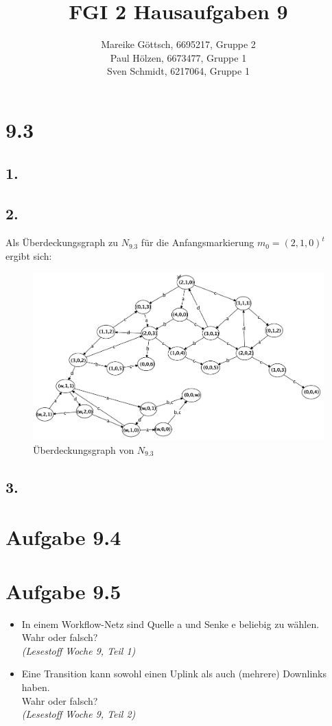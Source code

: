 \documentclass[12pt, paper=a4]{article}
\author{Mareike G\"ottsch, 6695217, Gruppe 2\\Paul H\"olzen, 6673477, Gruppe 1\\Sven Schmidt, 6217064, Gruppe 1}
\title{FGI 2 Hausaufgaben 9}
\begin{document}
\maketitle
\section*{9.3}

\subsection*{1.}
\subsection*{2.}
Als \"Uberdeckungsgraph zu \(N_{9.3}\) f\"ur die Anfangsmarkierung \(m_0=(2,1,0)^t\) ergibt sich:
\begin{figure}[h!]
	\centering
	\includegraphics[scale=0.35]{9_3_2.pdf}
	\caption{\"Uberdeckungsgraph von \(N_{9.3}\)}
\end{figure}

\subsection*{3.}


\section*{Aufgabe 9.4}

\section*{Aufgabe 9.5}
	\begin{itemize}
	\item In einem Workflow-Netz sind Quelle a und Senke e beliebig zu w\"ahlen.\\
		Wahr oder falsch?\\
		\textit{(Lesestoff Woche 9, Teil 1)}
	\item Eine Transition kann sowohl einen Uplink als auch (mehrere) Downlinks haben.\\
		Wahr oder falsch?\\
		\textit{(Lesestoff Woche 9, Teil 2)}
	\end{itemize}
\end{document}
